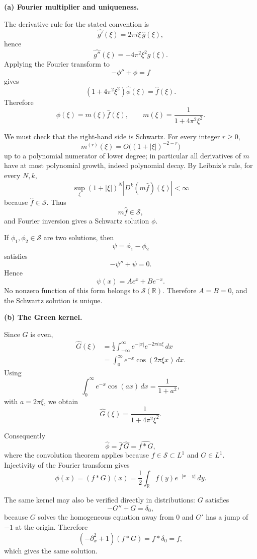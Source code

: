 \begin{solution}
\par\smallskip\noindent\textbf{(a) Fourier multiplier and uniqueness.}

The derivative rule for the stated convention is
\[
\widehat{g'}(\xi)
=
2\pi i\xi\,\widehat g(\xi),
\]
hence
\[
\widehat{g''}(\xi)
=
-4\pi^2\xi^2\widehat g(\xi).
\]
Applying the Fourier transform to
\[
-\phi''+\phi=f
\]
gives
\[
(1+4\pi^2\xi^2)\widehat\phi(\xi)
=
\widehat f(\xi).
\]
Therefore
\[
\boxed{
\widehat\phi(\xi)
=
m(\xi)\widehat f(\xi),
\qquad
m(\xi)
=
\frac1{1+4\pi^2\xi^2}.}
\]

We must check that the right-hand side is Schwartz. For every integer
\(r\ge0\),
\[
m^{(r)}(\xi)
=
O\bigl((1+|\xi|)^{-2-r}\bigr)
\]
up to a polynomial numerator of lower degree; in particular all
derivatives of \(m\) have at most polynomial growth, indeed polynomial
decay. By Leibniz's rule, for every \(N,k\),
\[
\sup_\xi
(1+|\xi|)^N
\left|
D^k(m\widehat f)(\xi)
\right|
<\infty
\]
because \(\widehat f\in\mathcal S\). Thus
\[
m\widehat f\in\mathcal S,
\]
and Fourier inversion gives a Schwartz solution \(\phi\).

If \(\phi_1,\phi_2\in\mathcal S\) are two solutions, then
\[
\psi=\phi_1-\phi_2
\]
satisfies
\[
-\psi''+\psi=0.
\]
Hence
\[
\psi(x)=Ae^x+Be^{-x}.
\]
No nonzero function of this form belongs to \(\mathcal S(\mathbb R)\).
Therefore \(A=B=0\), and the Schwartz solution is unique.

\par\smallskip\noindent\textbf{(b) The Green kernel.}

Since \(G\) is even,
\[
\begin{aligned}
\widehat G(\xi)
&=
\frac12
\int_{-\infty}^\infty
e^{-|x|}
e^{-2\pi i x\xi}\,dx\\
&=
\int_0^\infty
e^{-x}\cos(2\pi\xi x)\,dx.
\end{aligned}
\]
Using
\[
\int_0^\infty
e^{-x}\cos(ax)\,dx
=
\frac1{1+a^2},
\]
with \(a=2\pi\xi\), we obtain
\[
\boxed{
\widehat G(\xi)
=
\frac1{1+4\pi^2\xi^2}.}
\]

Consequently
\[
\widehat\phi
=
\widehat f\,\widehat G
=
\widehat{f*G},
\]
where the convolution theorem applies because \(f\in\mathcal S\subset
L^1\) and \(G\in L^1\). Injectivity of the Fourier transform gives
\[
\boxed{
\phi(x)
=
(f*G)(x)
=
\frac12
\int_{\mathbb R}
f(y)e^{-|x-y|}\,dy.}
\]

The same kernel may also be verified directly in distributions:
\(G\) satisfies
\[
-G''+G=\delta_0,
\]
because \(G\) solves the homogeneous equation away from \(0\) and
\(G'\) has a jump of \(-1\) at the origin. Therefore
\[
(-\partial_x^2+1)(f*G)
=
f*\delta_0
=
f,
\]
which gives the same solution.
\end{solution}



